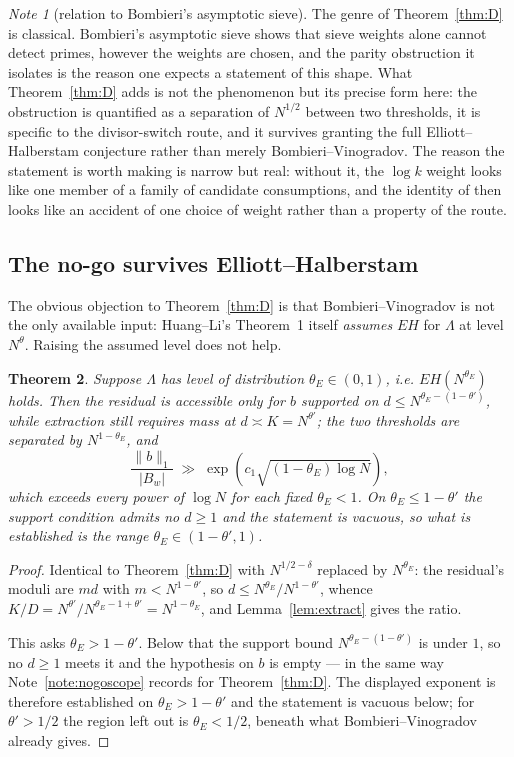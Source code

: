\documentclass[11pt,a4paper]{article}
\theoremstyle{plain}
\newtheorem{theorem}{Theorem}
\theoremstyle{definition}
\theoremstyle{remark}
\newtheorem{note}[theorem]{Note}
\begin{document}
\begin{note}[relation to Bombieri's asymptotic sieve]\label{note:bombieri}
The genre of Theorem~\ref{thm:D} is classical. Bombieri's asymptotic
sieve \cite{Bom76} shows that sieve weights alone cannot detect
primes, however the weights are chosen, and the parity obstruction it
isolates is the reason one expects a statement of this shape. What
Theorem~\ref{thm:D} adds is not the phenomenon but its precise form
here: the obstruction is quantified as a separation of $N^{1/2}$
between two thresholds, it is specific to the divisor-switch route,
and it survives granting the full Elliott--Halberstam conjecture
rather than merely Bombieri--Vinogradov. The reason the statement is
worth making is narrow but real: without it, the $\log k$ weight looks
like one member of a family of candidate consumptions, and the
identity of \cite[Theorem on the identity]{P1} then looks like an accident of one
choice of weight rather than a property of the route.
\end{note}

\subsection{The no-go survives Elliott--Halberstam}

The obvious objection to Theorem~\ref{thm:D} is that
Bombieri--Vinogradov is not the only available input: Huang--Li's
Theorem~1 itself \emph{assumes} $EH$ for $\Lambda$ at level
$N^{\theta}$. Raising the assumed level does not help.

\begin{theorem}\label{thm:Dprime}
Suppose $\Lambda$ has level of distribution $\theta_E\in(0,1)$, i.e.
$EH(N^{\theta_E})$ holds. Then the residual is accessible only for $b$
supported on $d\le N^{\theta_E-(1-\theta')}$, while extraction still
requires mass at $d\asymp K=N^{\theta'}$; the two thresholds are
separated by $N^{1-\theta_E}$, and
\[
  \frac{\|b\|_1}{|B_w|}\;\gg\;
  \exp\!\left(c_1\sqrt{(1-\theta_E)\log N}\right),
\]
which exceeds every power of $\log N$ for each fixed $\theta_E<1$. On
$\theta_E\le1-\theta'$ the support condition admits no $d\ge1$ and the
statement is vacuous, so what is established is the range
$\theta_E\in(1-\theta',1)$.
\end{theorem}

\begin{proof}
Identical to Theorem~\ref{thm:D} with $N^{1/2-\delta}$ replaced by
$N^{\theta_E}$: the residual's moduli are $md$ with $m<N^{1-\theta'}$,
so $d\le N^{\theta_E}/N^{1-\theta'}$, whence
$K/D=N^{\theta'}/N^{\theta_E-1+\theta'}=N^{1-\theta_E}$, and
Lemma~\ref{lem:extract} gives the ratio.

This asks $\theta_E>1-\theta'$. Below that the support bound
$N^{\theta_E-(1-\theta')}$ is under $1$, so no $d\ge1$ meets it and the
hypothesis on $b$ is empty --- in the same way
Note~\ref{note:nogoscope} records for Theorem~\ref{thm:D}. The
displayed exponent is therefore established on $\theta_E>1-\theta'$ and
the statement is vacuous below; for $\theta'>1/2$ the region left out
is $\theta_E<1/2$, beneath what Bombieri--Vinogradov already gives.
\end{proof}
\end{document}
